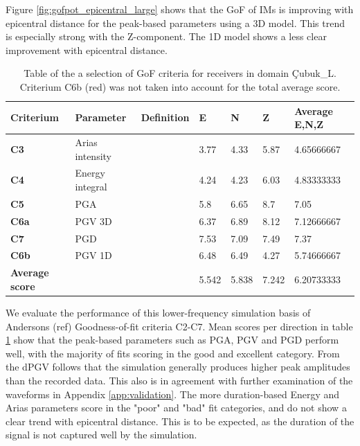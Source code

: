 \documentclass[../Text/00main.tex]{subfiles}
\begin{document}
 Figure \ref{fig:gofpot_epicentral_large} shows that the GoF of IMs is improving with epicentral distance for the peak-based parameters using a 3D model. This trend is especially strong with the Z-component. The 1D model shows a less clear improvement with epicentral distance. %

\begin{table}[h!]
\caption{Table of the a selection of \cite{anderson_quantitative_nodate} GoF criteria for receivers in domain Çubuk\_L. Criterium C6b (red) was not taken into account for the total average score. }
\begin{tabular}{@{}l|llllll@{}}

\toprule
\textbf{Criterium} & \textbf{Parameter} & \textbf{Definition} & \textbf{E} & \textbf{N} & \textbf{Z} & \textbf{Average E,N,Z} \\ \midrule
\textbf{C3}            & Arias intensity &  & 3.77  & 4.33  & 5.87  & 4.65666667 \\
\textbf{C4}            & Energy integral &  & 4.24  & 4.23  & 6.03  & 4.83333333 \\
\textbf{C5}            & PGA             &  & 5.8   & 6.65  & 8.7   & 7.05       \\
\textbf{C6a}           & PGV 3D          &  & 6.37  & 6.89  & 8.12  & 7.12666667 \\
\textbf{C7}            & PGD             &  & 7.53  & 7.09  & 7.49  & 7.37       \\
\rowcolor[HTML]{FFCCC9} 
\textbf{C6b}           & PGV 1D          &  & 6.48  & 6.49  & 4.27  & 5.74666667 \\ \midrule
\textbf{Average score} &                 &  & 5.542 & 5.838 & 7.242 & 6.20733333 \\ \bottomrule
\end{tabular}
\label{tab:GoF_table_large_domain}
\end{table}

We evaluate the performance of this lower-frequency simulation basis of Andersons (ref) Goodness-of-fit criteria C2-C7. Mean scores per direction in table \ref{tab:GoF_table_large_domain} show that the peak-based parameters such as PGA, PGV and PGD perform well, with the majority of fits scoring in the good and excellent category. From the dPGV follows that the simulation generally produces higher peak amplitudes than the recorded data. This also is in agreement with further examination of the waveforms in Appendix \ref{app:validation}. The more duration-based Energy and Arias parameters score in the "poor" and "bad" fit categories, and do not show a clear trend with epicentral distance. This is to be expected, as the duration of the signal is not captured well by the simulation. %
\end{document}
